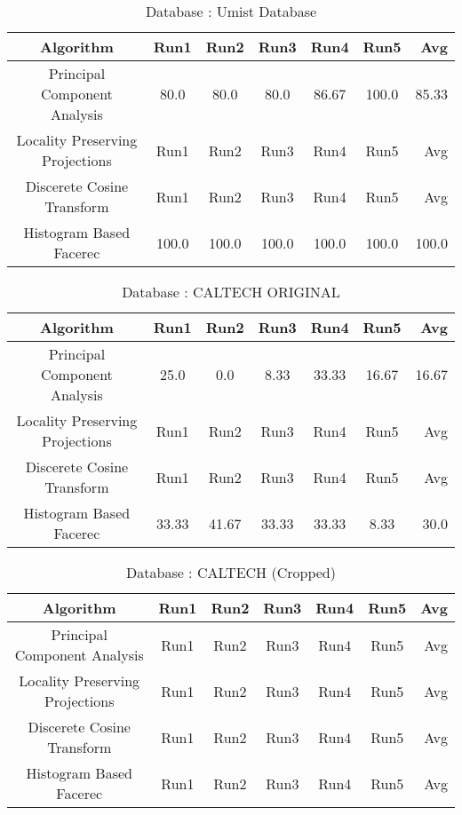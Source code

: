 \documentclass[10pt,a4paper]{article}
\begin{document}
\begin{center}
\begin{table}
\caption{Database : Umist Database }
\centering
\begin{tabular}{| c | c | c | c | c | c | r | } \hline 
Algorithm & Run1 & Run2 & Run3 & Run4 & Run5 & Avg  \\  
\hline
Principal Component Analysis & 80.0 & 80.0 & 80.0 & 86.67 & 100.0 & 85.33 \\
\hline
Locality Preserving Projections & Run1 & Run2 & Run3 & Run4 & Run5 & Avg \\
\hline
Discerete Cosine Transform & Run1 & Run2 & Run3 & Run4 & Run5 & Avg \\
\hline
Histogram Based Facerec & 100.0 & 100.0 & 100.0 & 100.0 & 100.0 & 100.0 \\
\hline
\end{tabular}
\end{table}


\begin{table}
\caption{Database : CALTECH ORIGINAL}
\centering
\begin{tabular}{| c | c | c | c | c | c | r | } \hline 
Algorithm & Run1 & Run2 & Run3 & Run4 & Run5 & Avg  \\  
\hline
Principal Component Analysis & 25.0 & 0.0 & 8.33 & 33.33 & 16.67 & 16.67 \\
\hline
Locality Preserving Projections & Run1 & Run2 & Run3 & Run4 & Run5 & Avg \\
\hline
Discerete Cosine Transform & Run1 & Run2 & Run3 & Run4 & Run5 & Avg \\
\hline
Histogram Based Facerec & 33.33 & 41.67 & 33.33 & 33.33 & 8.33 & 30.0 \\
\hline
\end{tabular}
\end{table}

\begin{table}
\caption{Database : CALTECH (Cropped) }
\centering
\begin{tabular}{| c | c | c | c | c | c | r | } \hline 
Algorithm & Run1 & Run2 & Run3 & Run4 & Run5 & Avg  \\  
\hline
Principal Component Analysis & Run1 & Run2 & Run3 & Run4 & Run5 & Avg \\
\hline
Locality Preserving Projections & Run1 & Run2 & Run3 & Run4 & Run5 & Avg \\
\hline
Discerete Cosine Transform & Run1 & Run2 & Run3 & Run4 & Run5 & Avg \\
\hline
Histogram Based Facerec & Run1 & Run2 & Run3 & Run4 & Run5 & Avg \\
\hline
\end{tabular}
\end{table}


\end{center}
\end{document}
